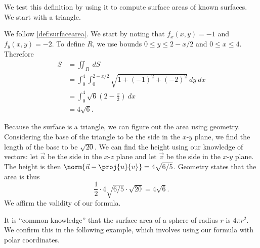 
We test this definition by using it to compute surface areas of known surfaces. We start with a triangle.

{We follow \autoref{def:surfacearea}. We start by noting that $f_x(x,y) = -1$ and $f_y(x,y) = -2$. To define $R$, we use bounds $0\leq y\leq 2-x/2$ and $0\leq x\leq 4$. Therefore
\begin{align*}
S &= \iint_R\ dS \\
  &= \int_0^4\int_0^{2-x/2} \sqrt{1+(-1)^2+(-2)^2}\ dy\ dx\\
	&= \int_0^4 \sqrt{6}\left(2-\frac x2\right)\ dx\\
	&= 4\sqrt{6}.
\end{align*}

Because the surface is a triangle, we can figure out the area using geometry. Considering the base of the triangle to be the side in the $x$-$y$ plane, we find the length of the base to be $\sqrt{20}$. We can find the height using our knowledge of vectors: let $\vec u$ be the side in the $x$-$z$ plane  and let $\vec v$ be the side in the $x$-$y$ plane. The height is then $\norm {\vec u - \proj{u}{v}} = 4\sqrt{6/5}$. Geometry states that the area is thus
\[\frac 12\cdot4\sqrt{6/5}\cdot\sqrt{20} = 4\sqrt{6}.\]
We affirm the validity of our formula.}

It is ``common knowledge'' that the surface area of a sphere of radius $r$ is $4\pi r^2$. We confirm this in the following example, which involves using our formula with polar coordinates.

